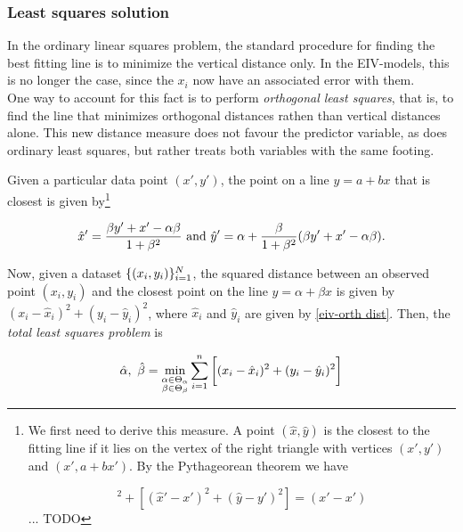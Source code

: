 \documentclass{homework}
\begin{document}
\subsubsection{Least squares solution}

In the ordinary linear squares problem, the standard procedure for finding the best fitting line is to minimize the vertical distance only. In the EIV-models, this is no longer the case, since the $x_i$ now have an associated error with them. \\

One way to account for this fact is to perform \textit{orthogonal least squares}, that is, to find the line that minimizes orthogonal distances rathen than vertical distances alone. This new distance measure does not favour the predictor variable, as does ordinary least squares, but rather treats both variables with the same footing. 

Given a particular data point $(x',y')$, the point on a line $y = a + bx$ that is closest is given by\footnote{We first need to derive this measure. A point $(\hat{x},\hat{y})$ is the closest to the fitting line if it lies on the vertex of the right triangle with vertices $(x', y')$ and $(x', a+bx')$. By the Pythageorean theorem we have

\begin{equation}
    [(\hat{x} - x')^2 + (\hat{y} - (a+bx'))^2]^2 + [(\hat{x}' - x')^2 + (\hat{y} - y')^2] = (x'-x') 
\end{equation}... TODO} 

\begin{align}
    \hat{x}' = \frac{\beta y'+x'-\alpha\beta}{1+\beta ^2} \textnormal{ and } \hat{y}' = \alpha  + \frac{\beta}{1+\beta ^2}(\beta y' + x' - \alpha \beta ).
    \label{eiv-orth dist}
\end{align}

Now, given a dataset $\{(x_i, y_i)\}_{i=1}^{N}$, the squared distance between an observed point $(x_i, y_i)$ and the closest point on the line $y = \alpha  + \beta x$ is given by $(x_i - \hat{x}_i)^2+(y_i - \hat{y}_i)^2$, where $\hat{x}_i$ and $\hat{y}_i$ are given by \eqref{eiv-orth dist}. Then, the \textit{total least squares problem} is

\begin{equation}
    \hat{\alpha}, \textnormal{ } \hat{\beta} =  \min_{\substack{
        \small{\alpha  \in \Theta_{\alpha}} \\
        \small{\beta  \in \Theta_{\beta}}
   }}\sum_{i=1}^{n} \bigg[(x_i - \hat{x}_i)^2+(y_i - \hat{y}_i)^2 \bigg]
    \label{eiv-minimization}
\end{equation}
\end{document}
